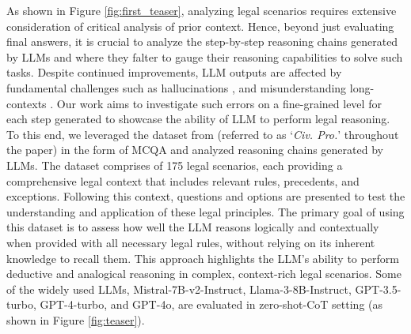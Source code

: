 
As shown in Figure \ref{fig:first_teaser}, analyzing legal scenarios requires extensive consideration of critical analysis of prior context. Hence, beyond just evaluating final answers, it is crucial to analyze the step-by-step reasoning chains generated by LLMs and where they falter to gauge their reasoning capabilities to solve such tasks. Despite continued improvements, LLM outputs are affected by fundamental challenges such as hallucinations \citep{dahl2024large, varshney2024investigating}, and misunderstanding long-contexts \citep{lu2024insights}. Our work aims to investigate such errors on a fine-grained level for each step generated to showcase the ability of LLM to perform legal reasoning. To this end, we leveraged the dataset from \citet{bongard2022legalargumentreasoningtask} (referred to as `\textit{Civ. Pro.}' throughout the paper) in the form of MCQA and analyzed reasoning chains generated by LLMs. The dataset comprises of 175 legal scenarios, each providing a comprehensive legal context that includes relevant rules, precedents, and exceptions. Following this context, questions and options are presented to test the understanding and application of these legal principles. The primary goal of using this dataset is to assess how well the LLM reasons logically and contextually when provided with all necessary legal rules, without relying on its inherent knowledge to recall them. This approach highlights the LLM's ability to perform deductive and analogical reasoning in complex, context-rich legal scenarios. Some of the widely used LLMs, Mistral-7B-v2-Instruct, Llama-3-8B-Instruct, GPT-3.5-turbo, GPT-4-turbo, and GPT-4o, are evaluated in zero-shot-CoT setting \citep{wei2023chainofthoughtpromptingelicitsreasoning} (as shown in Figure \ref{fig:teaser}). 


